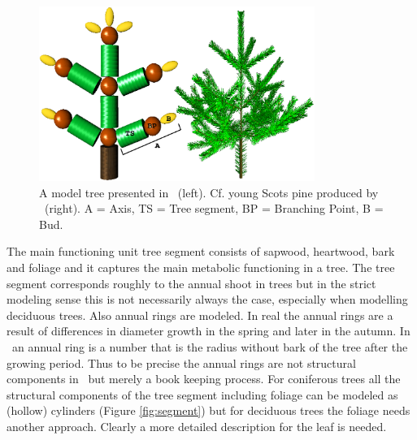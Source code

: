 \begin{figure}[h]
\begin{center}
\includegraphics[width=0.8\textwidth,height=0.5\textwidth]{lignum3d.eps}
\caption{\label{fig:struct} A model tree presented in \lignum\
(left). Cf. young Scots pine produced by \lignum\ (right). A = Axis, 
TS = Tree segment, BP = Branching Point, B = Bud.}
\end{center}
\end{figure}

The main functioning unit tree segment consists of sapwood, heartwood,
bark and foliage  and it captures the main  metabolic functioning in a
tree.  The  tree segment  corresponds roughly to  the annual  shoot in
trees but in the strict  modeling sense this is not necessarily always
the case, especially when modelling deciduous trees. Also annual rings
are modeled.  In real the annual  rings are a result of differences in
diameter growth in the spring and later in the autumn.  In \lignum\ an
annual ring  is a number that is  the radius without bark  of the tree
after the growing period.  Thus to be precise the annual rings are not
structural components  in \lignum\ but merely a  book keeping process.
For coniferous trees all the structural components of the tree segment
including  foliage  can  be  modeled  as  (hollow)  cylinders  (Figure
\ref{fig:segment}) but  for deciduous trees the  foliage needs another
approach.  Clearly a more detailed description for the leaf is needed.

